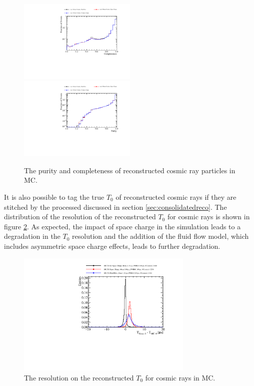\begin{figure}
\includegraphics[width=0.5\textwidth]{Figures/Metrics/MC/Cosmics/CosmicRayCompleteness.pdf}
\includegraphics[width=0.5\textwidth]{Figures/Metrics/MC/Cosmics/CosmicRayPurity.pdf}
\caption{The purity and completeness of reconstructed cosmic ray particles in MC.}
\label{fig:crrecopurcom}
\end{figure}

It is also possible to tag the true $T_{0}$ of reconstructed cosmic rays if they are stitched by the processed discussed in section \ref{sec:consolidatedreco}.  The distribution of the resolution of the reconstructed $T_{0}$ for cosmic rays is shown in figure \ref{fig:crt0res}.  As expected, the impact of space charge in the simulation leads to a degradation in the $T_{0}$ resolution and the addition of the fluid flow model, which includes asymmetric space charge effects, leads to further degradation.  

\begin{figure}
\centering
\includegraphics[width=0.75\textwidth]{Figures/Metrics/MC/Cosmics/CosmicRayT0Resolustion.pdf}
\caption{The resolution on the reconstructed $T_{0}$ for cosmic rays in MC.}
\label{fig:crt0res}
\end{figure}

